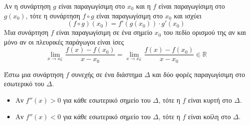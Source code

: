 Αν η συνάρτηση $g$ είναι παραγωγίσιμη στο $x_0$ και η $f$ είναι παραγωγίσιμη στο $g(x_0)$, τότε η συνάρτηση $f\circ g$ είναι παραγωγίσιμη στο $x_0$ και ισχύει
\[(f\circ g)(x_0)=f'(g(x_0))\cdot g'(x_0)\]
Μια συνάρτηση $f$ είναι παραγωγίσιμη σε ένα σημείο $x_0$ του πεδίο ορισμού της αν και μόνο αν οι πλευρικές παράγωγοι είναι ίσες
\[\lim\limits_{x\to x_0^-}{\frac{f(x)-f(x_0)}{x-x_0}}=\lim\limits_{x\to x_0^-}{\frac{f(x)-f(x_0)}{x-x_0}}\in\mathbb{R}\]

Έστω μια συνάρτηση $f$ συνεχής σε ένα διάστημα $\varDelta$ και δύο φορές παραγωγίσιμη στο εσωτερικό του $\varDelta$.
\begin{itemize}
\item Αν $f''(x)>0$ για κάθε εσωτερικό σημείο του $\varDelta$, τότε η $f$ είναι κυρτή στο $\varDelta$.
\item Αν $f''(x)<0$ για κάθε εσωτερικό σημείο του $\varDelta$, τότε η $f$ είναι κοίλη στο $\varDelta$.
\end{itemize}


